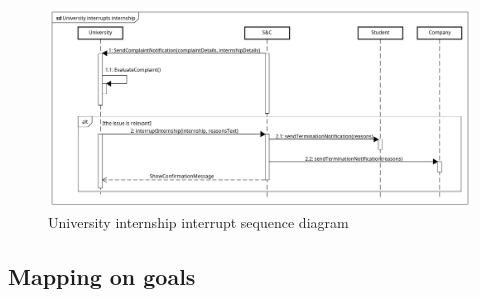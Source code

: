 \begin{figure}[H]
    \centering
    \includegraphics[width=1\linewidth]{Images/Sequence diagrams/University interrupts internship.png}
    \caption{University internship interrupt sequence diagram}
    \label{fig:enter-label}
\end{figure}


\clearpage

\subsection{Mapping on goals}
\label{subsec: map_on_g}%


